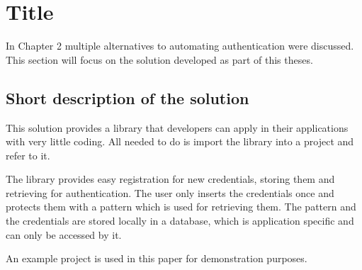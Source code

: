 
\chapter{Title} %

In Chapter 2 multiple alternatives to automating authentication were discussed. This section will focus on the solution developed as part of this theses. 



\ifpdf
    \graphicspath{{X/figures/PNG/}{X/figures/PDF/}{X/figures/}}
\else
    \graphicspath{{X/figures/EPS/}{X/figures/}}
\fi


\section{Short description of the solution}
This solution provides a library that developers can apply in their applications with very little coding. All needed to do is import the library into a project and refer to it.

The library provides easy registration for new credentials, storing them and retrieving for authentication. The user only inserts the credentials once and protects them with a pattern which is used for retrieving them. The pattern and the credentials are stored locally in a database, which is application specific and can only be accessed by it. 

An example project is used in this paper for demonstration purposes.

\newpage

